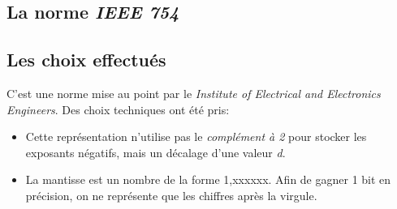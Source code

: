 \documentclass[a4paper,11pt]{article}
\begin{document}
\begin{Form}
\section{La norme \emph{IEEE 754}}
\subsection{Les choix effectués}
C'est une norme mise au point par le \emph{Institute of Electrical and Electronics Engineers}. Des choix techniques ont été pris:
\begin{itemize}
\item Cette représentation n'utilise pas le \emph{complément à 2} pour stocker les exposants négatifs, mais un décalage d'une valeur \emph{d}.
\item La mantisse est un nombre de la forme 1,xxxxxx. Afin de gagner 1 bit en précision, on ne représente que les chiffres après la virgule.
\end{itemize}

\end{Form}
\end{document}

